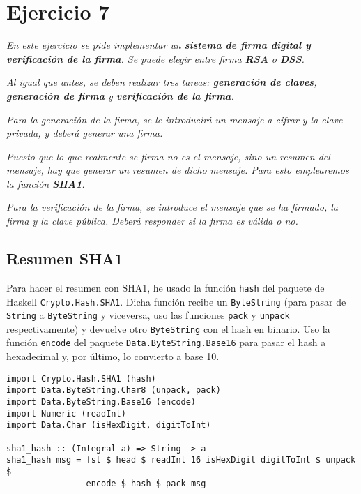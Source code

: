 \documentclass[10pt,spanish]{article}
\begin{document}
\section{\textcolor{azul}Ejercicio 7}
\textit{En este ejercicio se pide implementar un \textbf{\textcolor{azul}{sistema de firma digital y verificación de la firma}}. Se puede elegir entre firma \textbf{\textcolor{azul}{RSA}} o \textbf{\textcolor{azul}{DSS}}.}

\textit{Al igual que antes, se deben realizar tres tareas: \textbf{\textcolor{azul}{generación de claves}}, \textbf{\textcolor{azul}{generación de firma}} y \textbf{\textcolor{azul}{verificación de la firma}}.}

\textit{Para la generación de la firma, se le introducirá un mensaje a cifrar y la clave privada, y deberá generar una firma.}

\textit{Puesto que lo que realmente se firma no es el mensaje, sino un resumen del mensaje, hay que generar un resumen de dicho mensaje. Para esto emplearemos la función \textbf{\textcolor{azul}{SHA1}}.}

\textit{Para la verificación de la firma, se introduce el mensaje que se ha firmado, la firma y la clave pública. Deberá responder si la firma es válida o no.}


\subsection{\textcolor{azul}Resumen SHA1}
Para hacer el resumen con SHA1, he usado la función \texttt{hash} del paquete de Haskell \texttt{Crypto.Hash.SHA1}. Dicha función recibe un \texttt{ByteString} (para pasar de \texttt{String} a \texttt{ByteString} y viceversa, uso las funciones \texttt{pack} y \texttt{unpack} respectivamente) y devuelve otro \texttt{ByteString} con el hash en binario. Uso la función \texttt{encode} del paquete \texttt{Data.ByteString.Base16} para pasar el hash a hexadecimal y, por último, lo convierto a base 10.

\begin{verbatim}
import Crypto.Hash.SHA1 (hash)
import Data.ByteString.Char8 (unpack, pack)
import Data.ByteString.Base16 (encode)
import Numeric (readInt)
import Data.Char (isHexDigit, digitToInt)

sha1_hash :: (Integral a) => String -> a
sha1_hash msg = fst $ head $ readInt 16 isHexDigit digitToInt $ unpack $
                encode $ hash $ pack msg
\end{verbatim}
\end{document}
